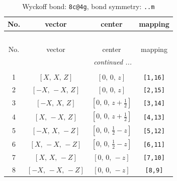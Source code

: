 \documentclass[fleqn,8pt]{jsarticle}
\begin{document}
\renewcommand{\arraystretch}{1.2}
\begin{longtable}{cccc}
\caption{Wyckoff bond: {\tt 8c@4g}, bond symmetry: {\tt ..m}}
 \\
 \hline \hline
No. & vector & center & mapping \\ \hline \endfirsthead

\multicolumn{3}{l}{\tablename\ \thetable{}} \\
 \hline \hline
No. & vector & center & mapping \\ \hline \endhead

 \hline \hline
\multicolumn{3}{r}{\footnotesize\it continued ...} \\ \endfoot

 \hline \hline
\multicolumn{3}{r}{} \\ \endlastfoot

1 & $\left[ X,\, X,\, Z \right]$ & $\left[ 0,\, 0,\, z \right]$ & {\tt [1,16]} \\ \hline
2 & $\left[ - X,\, - X,\, Z \right]$ & $\left[ 0,\, 0,\, z \right]$ & {\tt [2,15]} \\ \hline
3 & $\left[ - X,\, X,\, Z \right]$ & $\left[ 0,\, 0,\, z + \frac{1}{2} \right]$ & {\tt [3,14]} \\ \hline
4 & $\left[ X,\, - X,\, Z \right]$ & $\left[ 0,\, 0,\, z + \frac{1}{2} \right]$ & {\tt [4,13]} \\ \hline
5 & $\left[ - X,\, X,\, - Z \right]$ & $\left[ 0,\, 0,\, \frac{1}{2} - z \right]$ & {\tt [5,12]} \\ \hline
6 & $\left[ X,\, - X,\, - Z \right]$ & $\left[ 0,\, 0,\, \frac{1}{2} - z \right]$ & {\tt [6,11]} \\ \hline
7 & $\left[ X,\, X,\, - Z \right]$ & $\left[ 0,\, 0,\, - z \right]$ & {\tt [7,10]} \\ \hline
8 & $\left[ - X,\, - X,\, - Z \right]$ & $\left[ 0,\, 0,\, - z \right]$ & {\tt [8,9]} \\
\end{longtable}
\renewcommand{\arraystretch}{1.2}
\end{document}
